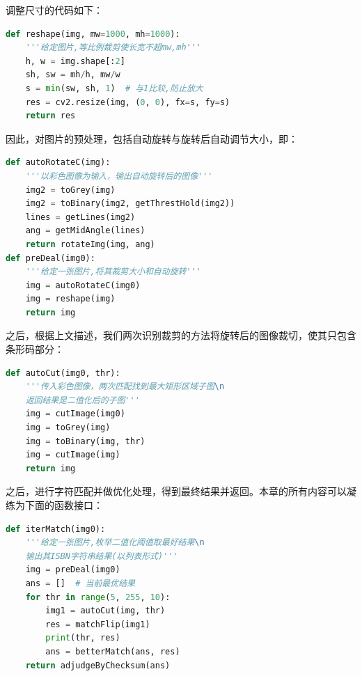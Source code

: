 \documentclass{ctexart}
\begin{document}
调整尺寸的代码如下：

\begin{lstlisting}[language=python]
def reshape(img, mw=1000, mh=1000):
    '''给定图片,等比例裁剪使长宽不超mw,mh'''
    h, w = img.shape[:2]
    sh, sw = mh/h, mw/w
    s = min(sw, sh, 1)  # 与1比较,防止放大
    res = cv2.resize(img, (0, 0), fx=s, fy=s)
    return res
\end{lstlisting}

因此，对图片的预处理，包括自动旋转与旋转后自动调节大小，即：

\begin{lstlisting}[language=python]
def autoRotateC(img):
    '''以彩色图像为输入，输出自动旋转后的图像'''
    img2 = toGrey(img)
    img2 = toBinary(img2, getThrestHold(img2))
    lines = getLines(img2)
    ang = getMidAngle(lines)
    return rotateImg(img, ang)
def preDeal(img0):
    '''给定一张图片,将其裁剪大小和自动旋转'''
    img = autoRotateC(img0)
    img = reshape(img)
    return img
\end{lstlisting}

之后，根据上文描述，我们两次识别裁剪的方法将旋转后的图像裁切，使其只包含条形码部分：

\begin{lstlisting}[language=python]
def autoCut(img0, thr):
    '''传入彩色图像，两次匹配找到最大矩形区域子图\n
    返回结果是二值化后的子图'''
    img = cutImage(img0)
    img = toGrey(img)
    img = toBinary(img, thr)
    img = cutImage(img)
    return img
\end{lstlisting}

之后，进行字符匹配并做优化处理，得到最终结果并返回。本章的所有内容可以凝练为下面的函数接口：

\begin{lstlisting}[language=python]
def iterMatch(img0):
    '''给定一张图片,枚举二值化阈值取最好结果\n
    输出其ISBN字符串结果(以列表形式)'''
    img = preDeal(img0)
    ans = []  # 当前最优结果
    for thr in range(5, 255, 10):
        img1 = autoCut(img, thr)
        res = matchFlip(img1)
        print(thr, res)
        ans = betterMatch(ans, res)
    return adjudgeByChecksum(ans)
\end{lstlisting}

\end{document}

